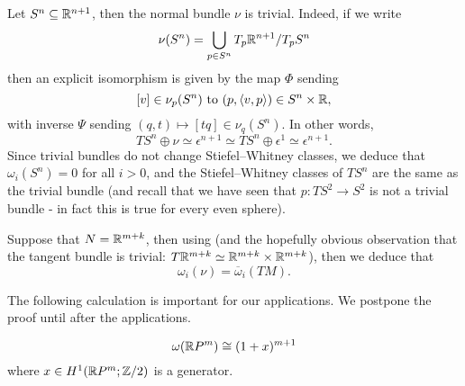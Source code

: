 \documentclass[ma3408.tex]{subfiles}
\begin{document}
\begin{Exa}
Let $S^n \subseteq \mathbb{R}^{n+1}$, then the normal bundle $\nu$ is trivial. Indeed, if we write
\[
\nu({S}^n) = \bigcup_{p \in S^n} T_p\mathbb{R}^{n+1}/T_pS^n
\]
then an explicit isomorphism is given by the map $\Phi$ sending
\[
[v] \in \nu_p({S}^n) \text{ to } (p,\langle v,p \rangle) \in S^n \times \mathbb{R},
\]
with inverse $\Psi$ sending $(q,t) \mapsto [tq] \in \nu_q({S}^n)$. In other words,
\[
TS^n \oplus \nu \simeq \epsilon^{n+1} \simeq TS^n \oplus \epsilon^1 \simeq \epsilon^{n+1}. 
\]
Since trivial bundles do not change Stiefel--Whitney classes, we deduce that $\omega_i(S^n) = 0$ for all $i > 0$, and the Stiefel--Whitney classes of $TS^n$ are the same as the trivial bundle (and recall that we have seen that $p \colon TS^2 \to S^2$ is not a trivial bundle - in fact this is true for every even sphere).
\end{Exa}
\begin{Exa}
Suppose that $N = \mathbb{R}^{m+k}$, then using  (and the hopefully obvious observation that the tangent bundle is trivial: $T\mathbb{R}^{m+k} \simeq \mathbb{R}^{m+k} \times \mathbb{R}^{m+k}$), then we deduce that
\begin{equation}\label{eq:embedding-formula}
\omega_i(\nu) = \overline{\omega}_i(TM). 
\end{equation}
\end{Exa}
The following calculation is important for our applications. We postpone the proof until after the applications. 
\begin{Thm}\label{thm:sw-rpm}
\[\omega(\mathbb{R} P^m) \cong (1+x)^{m+1}\]
where $x \in H^1(\mathbb{R} P^m;\mathbb{Z}/2)$ is a generator. 
\end{Thm}
\end{document}
